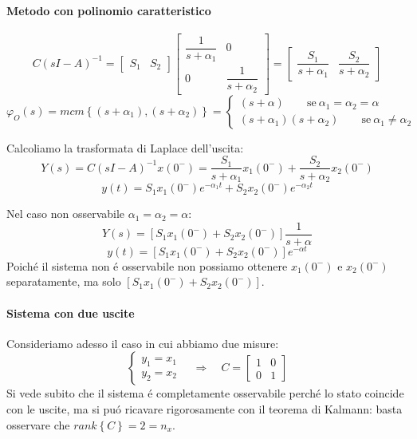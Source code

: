 \documentclass[../main.tex]{subfiles}
\begin{document}
\begin{Exercise}[title={Studiare l'osservabilit\'a di due vasche in parallelo}]
			\paragraph{Metodo con polinomio caratteristico}
				\[
					C(sI-A)^{-1} =
					\begin{bmatrix}
						S_1 & S_2
					\end{bmatrix}
					\begin{bmatrix}
						\dfrac{1}{s+\alpha_1} & 0\\
						0 & \dfrac{1}{s+\alpha_2}
					\end{bmatrix} =
					\begin{bmatrix}
						\dfrac{S_1}{s+\alpha_1} & \dfrac{S_2}{s+\alpha_2}
					\end{bmatrix}
				\]
				\[
					\varphi_O(s) = mcm\left\lbrace (s+\alpha_1), (s+\alpha_2) \right\rbrace =
					\begin{cases}
						(s+\alpha) \qquad\text{se}\ \alpha_1 = \alpha_2 = \alpha\\
						(s+\alpha_1)(s+\alpha_2) \qquad\text{se}\ \alpha_1 \neq \alpha_2
					\end{cases}
				\]
				
				Calcoliamo la trasformata di Laplace dell'uscita:
				\[
					Y(s) = C(sI-A)^{-1} x(0^{-}) = \dfrac{S_1}{s+\alpha_1}x_1(0^{-}) + \dfrac{S_2}{s+\alpha_2}x_2(0^{-})
				\]
				\[
					y(t) = S_1x_1(0^{-}) e^{-\alpha_1 t} + S_2x_2(0^{-}) e^{-\alpha_2 t}
				\]
				
				Nel caso non osservabile $ \alpha_1 = \alpha_2 = \alpha $:
				\[
					Y(s) = [S_1 x_1(0^{-}) + S_2 x_2(0^{-})] \dfrac{1}{s+\alpha}
				\]
				\[
					y(t) = [S_1 x_1(0^{-}) + S_2 x_2(0^{-})] e^{-\alpha t}
				\]
				Poich\'e il sistema non \'e osservabile non possiamo ottenere $ x_1(0^{-}) $ e $ x_2(0^{-}) $ separatamente, ma solo $ \left[ S_1 x_1(0^{-}) + S_2 x_2(0^{-}) \right] $.
			
			\paragraph{Sistema con due uscite}
				Consideriamo adesso il caso in cui abbiamo due misure:
				\[
					\begin{cases}
						y_1 = x_1\\
						y_2 = x_2
					\end{cases}
					\quad\Rightarrow\quad
					C =
					\begin{bmatrix}
						1 & 0\\
						0 & 1
					\end{bmatrix}
				\]
				Si vede subito che il sistema \'e completamente osservabile perch\'e lo stato coincide con le uscite, ma si pu\'o ricavare rigorosamente con il teorema di Kalmann: basta osservare che $ rank\left\lbrace C \right\rbrace = 2 = n_x $.
				

\end{Exercise}
\end{document}
